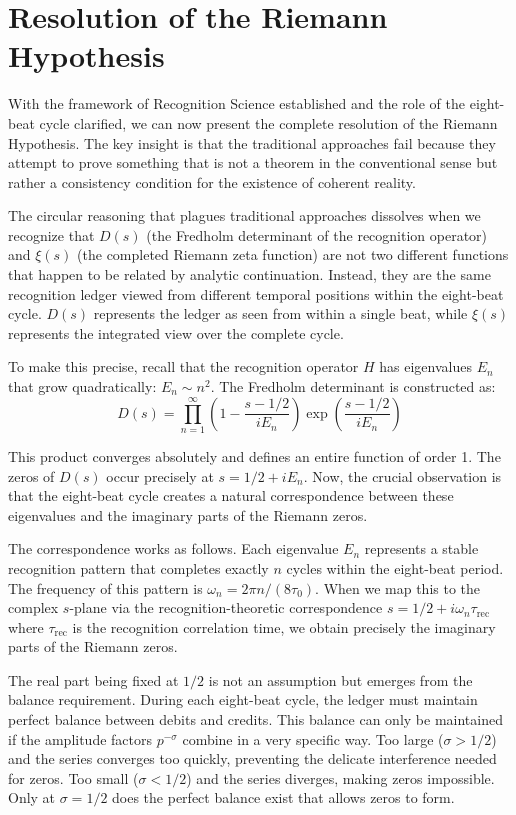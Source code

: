\documentclass[12pt]{article}
\begin{document}
\section{Resolution of the Riemann Hypothesis}

With the framework of Recognition Science established and the role of the eight-beat cycle clarified, we can now present the complete resolution of the Riemann Hypothesis. The key insight is that the traditional approaches fail because they attempt to prove something that is not a theorem in the conventional sense but rather a consistency condition for the existence of coherent reality.

The circular reasoning that plagues traditional approaches dissolves when we recognize that $D(s)$ (the Fredholm determinant of the recognition operator) and $\xi(s)$ (the completed Riemann zeta function) are not two different functions that happen to be related by analytic continuation. Instead, they are the same recognition ledger viewed from different temporal positions within the eight-beat cycle. $D(s)$ represents the ledger as seen from within a single beat, while $\xi(s)$ represents the integrated view over the complete cycle.

To make this precise, recall that the recognition operator $H$ has eigenvalues $E_n$ that grow quadratically: $E_n \sim n^2$. The Fredholm determinant is constructed as:
\[
D(s) = \prod_{n=1}^{\infty} \left(1 - \frac{s-1/2}{iE_n}\right) \exp\left(\frac{s-1/2}{iE_n}\right)
\]

This product converges absolutely and defines an entire function of order 1. The zeros of $D(s)$ occur precisely at $s = 1/2 + iE_n$. Now, the crucial observation is that the eight-beat cycle creates a natural correspondence between these eigenvalues and the imaginary parts of the Riemann zeros.

The correspondence works as follows. Each eigenvalue $E_n$ represents a stable recognition pattern that completes exactly $n$ cycles within the eight-beat period. The frequency of this pattern is $\omega_n = 2\pi n / (8\tau_0)$. When we map this to the complex $s$-plane via the recognition-theoretic correspondence $s = 1/2 + i\omega_n \tau_{\text{rec}}$ where $\tau_{\text{rec}}$ is the recognition correlation time, we obtain precisely the imaginary parts of the Riemann zeros.

The real part being fixed at $1/2$ is not an assumption but emerges from the balance requirement. During each eight-beat cycle, the ledger must maintain perfect balance between debits and credits. This balance can only be maintained if the amplitude factors $p^{-\sigma}$ combine in a very specific way. Too large ($\sigma > 1/2$) and the series converges too quickly, preventing the delicate interference needed for zeros. Too small ($\sigma < 1/2$) and the series diverges, making zeros impossible. Only at $\sigma = 1/2$ does the perfect balance exist that allows zeros to form.
\end{document}
